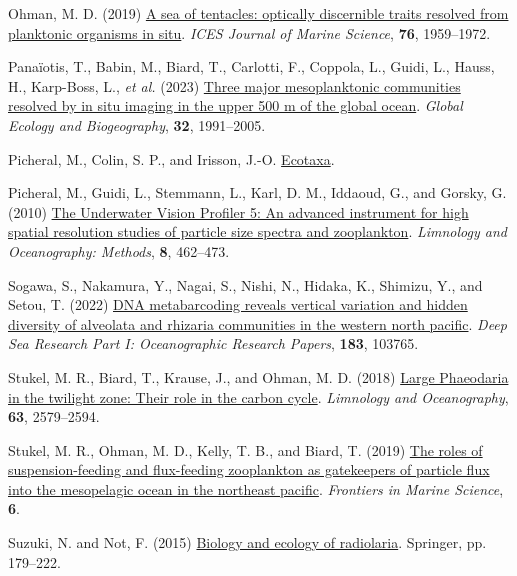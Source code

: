 \documentclass[
]{article}
\newlength{\cslhangindent}
\newenvironment{CSLReferences}[2] %
 {\begin{list}{}{%
  \setlength{\itemindent}{0pt}
  \setlength{\leftmargin}{0pt}
  \setlength{\parsep}{0pt}
  \ifodd #1
   \setlength{\leftmargin}{\cslhangindent}
   \setlength{\itemindent}{-1\cslhangindent}
  \fi
  \setlength{\itemsep}{#2\baselineskip}}}
 {\end{list}}
\begin{document}
\begin{CSLReferences}{1}{0}
Ohman, M. D. (2019) \href{https://doi.org/10.1093/icesjms/fsz184}{A sea
of tentacles: optically discernible traits resolved from planktonic
organisms in situ}. \emph{ICES Journal of Marine Science}, \textbf{76},
1959--1972.

Panaïotis, T., Babin, M., Biard, T., Carlotti, F., Coppola, L., Guidi,
L., Hauss, H., Karp-Boss, L., \emph{et al.} (2023)
\href{https://doi.org/10.1111/geb.13741}{Three major mesoplanktonic
communities resolved by in situ imaging in the upper 500 m of the global
ocean}. \emph{Global Ecology and Biogeography}, \textbf{32}, 1991--2005.

Picheral, M., Colin, S. P., and Irisson, J.-O.
\href{https://ecotaxa.obs-vlfr.fr/}{Ecotaxa}.

Picheral, M., Guidi, L., Stemmann, L., Karl, D. M., Iddaoud, G., and
Gorsky, G. (2010) \href{https://doi.org/10.4319/lom.2010.8.462}{The
Underwater Vision Profiler 5: An advanced instrument for high spatial
resolution studies of particle size spectra and zooplankton}.
\emph{Limnology and Oceanography: Methods}, \textbf{8}, 462--473.

Sogawa, S., Nakamura, Y., Nagai, S., Nishi, N., Hidaka, K., Shimizu, Y.,
and Setou, T. (2022)
\href{https://doi.org/10.1016/j.dsr.2022.103765}{DNA metabarcoding
reveals vertical variation and hidden diversity of alveolata and
rhizaria communities in the western north pacific}. \emph{Deep Sea
Research Part I: Oceanographic Research Papers}, \textbf{183}, 103765.

Stukel, M. R., Biard, T., Krause, J., and Ohman, M. D. (2018)
\href{https://doi.org/10.1002/lno.10961}{Large Phaeodaria in the
twilight zone: Their role in the carbon cycle}. \emph{Limnology and
Oceanography}, \textbf{63}, 2579--2594.

Stukel, M. R., Ohman, M. D., Kelly, T. B., and Biard, T. (2019)
\href{https://www.frontiersin.org/articles/10.3389/fmars.2019.00397}{The
roles of suspension-feeding and flux-feeding zooplankton as gatekeepers
of particle flux into the mesopelagic ocean in the northeast pacific}.
\emph{Frontiers in Marine Science}, \textbf{6}.

Suzuki, N. and Not, F. (2015)
\href{https://link.springer.com/chapter/10.1007/978-4-431-55130-0_8}{Biology
and ecology of radiolaria}. Springer, pp. 179--222.


\end{CSLReferences}
\end{document}
